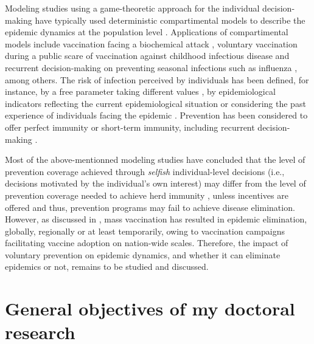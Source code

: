 Modeling studies using a game-theoretic approach for the individual decision-making have typically used deterministic compartimental models to describe the epidemic dynamics at the population level \cite[]{Bauch2003,Bauch2004,Breban2006,DOnofrio2007,Vardavas2007,Galvani2007,Breban2011,Liu2012}. Applications of compartimental models include vaccination facing a biochemical attack \cite[]{Bauch2003}, voluntary vaccination during a public scare of vaccination against childhood infectious disease \cite[]{Bauch2004} and recurrent decision-making on preventing seasonal infections such as influenza \cite[]{Breban2006,Galvani2007}, among others. The risk of infection perceived by individuals has been defined, for instance, by a free parameter taking different values \cite[]{Bauch2004}, by epidemiological indicators reflecting the current epidemiological situation \cite[]{Bauch2003,DOnofrio2007,Breban2011,Liu2012} or considering the past experience of individuals facing the epidemic \cite[]{Breban2006,Vardavas2007,DOnofrio2007}. Prevention has been considered to offer perfect immunity \cite[]{Bauch2003,Bauch2004,DOnofrio2007} or short-term immunity, including recurrent decision-making \cite[]{Breban2006}. 

Most of the above-mentionned modeling studies have concluded that the level of prevention coverage achieved through \emph{selfish} individual-level decisions  (i.e., decisions motivated by the individual's own interest) may differ from the level of prevention coverage needed to achieve herd immunity \cite[]{Bauch2003,Bauch2004,Breban2006,Galvani2007,Breban2011}, unless incentives are offered \cite[]{Vardavas2007,Liu2012} and thus, prevention programs may fail to achieve disease elimination. %
However, as discussed in , mass vaccination has resulted in epidemic elimination, globally, regionally or at least temporarily, owing to vaccination campaigns facilitating vaccine adoption on nation-wide scales. Therefore, the impact of voluntary prevention on epidemic dynamics, and whether it can eliminate epidemics or not, remains to be studied and discussed.

\section{General objectives of my doctoral research}
\label{Intro:Objectives} 

